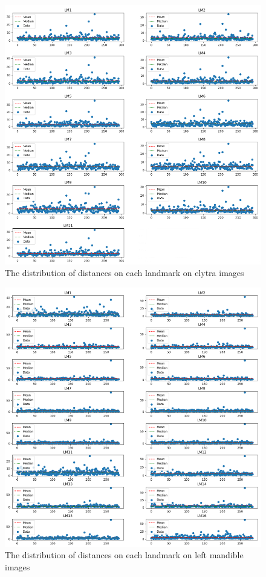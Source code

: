 \documentclass[review]{elsarticle}
\begin{document}
\begin{figure}[htbp]
    \centering
    \includegraphics[scale=0.5]{images/charts/elytre_2.png}
    \caption{The distribution of distances on each landmark on elytra images}
\end{figure}

\begin{figure}[htbp]
    \centering
    \includegraphics[scale=0.5]{images/charts/mg_2.png}
    \caption{The distribution of distances on each landmark on left mandible images}
\end{figure}
\end{document}
